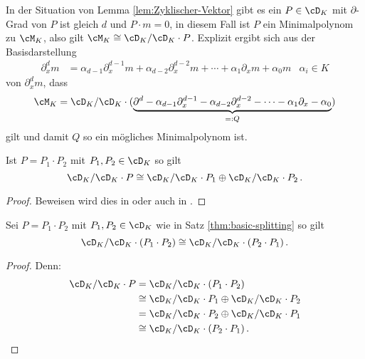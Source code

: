 \begin{prop} \label{prop:Zyklischer-Vektor}
In der Situation von Lemma \ref{lem:Zyklischer-Vektor} gibt es ein $P\in
\cD_K$ mit $\partial$-Grad von $P$ ist gleich $d$ und $P \cdot m=0$, in
diesem Fall ist $P$ ein Minimalpolynom zu $\cM_K$, also gilt
$\cM_K\cong\cD_K/\cD_K\cdot P$. Explizit ergibt sich aus der Basisdarstellung
\begin{align*}
\partial_x^d m&= \alpha_{d-1}\partial_x^{d-1}m + \alpha_{d-2}\partial_x^{d-2}m
  + \cdots + \alpha_1\partial_xm + \alpha_0m & \alpha_i\in K
\end{align*}
von $\partial_x^d m$, dass
\[
\cM_K=\cD_K/\cD_K\cdot( \underset{=:Q}{\underbrace{
  \partial^d - \alpha_{d-1}\partial_x^{d-1} - \alpha_{d-2}\partial_x^{d-2} -
  \cdots - \alpha_1\partial_x - \alpha_0 }} )
\]
gilt und damit $Q$ so ein mögliches Minimalpolynom ist.
\begin{comment}
Ist irgendwie nicht gut :(
\end{comment}
\end{prop}

\begin{thm}\label{thm:basic-splitting}
Ist $P=P_1\cdot P_2$ mit $P_1,P_2\in \cD_K$ so gilt
\[
\cD_K/\cD_K\cdot P \cong \cD_K/\cD_K\cdot P_1 \oplus \cD_K/\cD_K\cdot P_2 \,.
\]
\end{thm}
\begin{proof}
Beweisen wird dies in
\cite[Seite 57-64]{ZulaBarbara}
oder auch in \cite[Seite 30-32]{sabbah_cimpa90}.
\end{proof}
\begin{cor} \label{cor:moduluKomutativität}
Sei $P=P_1\cdot P_2$ mit $P_1,P_2\in \cD_K$ wie in Satz
\ref{thm:basic-splitting} so gilt
\[
\cD_K/\cD_K\cdot (P_1\cdot P_2) \cong \cD_K/\cD_K\cdot (P_2 \cdot P_1) \,.
\]
\end{cor}
\begin{comment}
TODO: verweise auf dieses Korollar
\end{comment}
\begin{proof} Denn:
\begin{align*}
\cD_K/\cD_K\cdot P &= \cD_K/\cD_K\cdot (P_1\cdot P_2)\\
  &\cong \cD_K/\cD_K\cdot P_1 \oplus \cD_K/\cD_K\cdot P_2\\
  &= \cD_K/\cD_K\cdot P_2 \oplus \cD_K/\cD_K\cdot P_1\\
  &\cong \cD_K/\cD_K\cdot (P_2 \cdot P_1) \,.
\end{align*}
\end{proof}

